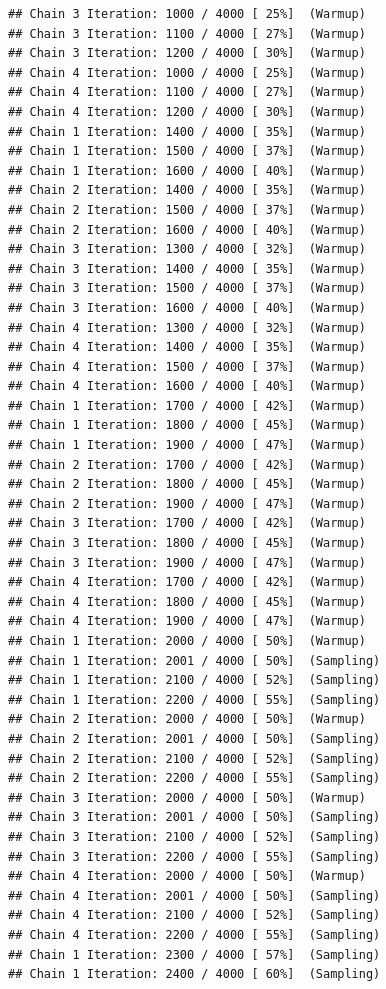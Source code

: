 \documentclass[
]{article}
\begin{document}
\begin{verbatim}
## Chain 3 Iteration: 1000 / 4000 [ 25%]  (Warmup) 
## Chain 3 Iteration: 1100 / 4000 [ 27%]  (Warmup) 
## Chain 3 Iteration: 1200 / 4000 [ 30%]  (Warmup) 
## Chain 4 Iteration: 1000 / 4000 [ 25%]  (Warmup) 
## Chain 4 Iteration: 1100 / 4000 [ 27%]  (Warmup) 
## Chain 4 Iteration: 1200 / 4000 [ 30%]  (Warmup) 
## Chain 1 Iteration: 1400 / 4000 [ 35%]  (Warmup) 
## Chain 1 Iteration: 1500 / 4000 [ 37%]  (Warmup) 
## Chain 1 Iteration: 1600 / 4000 [ 40%]  (Warmup) 
## Chain 2 Iteration: 1400 / 4000 [ 35%]  (Warmup) 
## Chain 2 Iteration: 1500 / 4000 [ 37%]  (Warmup) 
## Chain 2 Iteration: 1600 / 4000 [ 40%]  (Warmup) 
## Chain 3 Iteration: 1300 / 4000 [ 32%]  (Warmup) 
## Chain 3 Iteration: 1400 / 4000 [ 35%]  (Warmup) 
## Chain 3 Iteration: 1500 / 4000 [ 37%]  (Warmup) 
## Chain 3 Iteration: 1600 / 4000 [ 40%]  (Warmup) 
## Chain 4 Iteration: 1300 / 4000 [ 32%]  (Warmup) 
## Chain 4 Iteration: 1400 / 4000 [ 35%]  (Warmup) 
## Chain 4 Iteration: 1500 / 4000 [ 37%]  (Warmup) 
## Chain 4 Iteration: 1600 / 4000 [ 40%]  (Warmup) 
## Chain 1 Iteration: 1700 / 4000 [ 42%]  (Warmup) 
## Chain 1 Iteration: 1800 / 4000 [ 45%]  (Warmup) 
## Chain 1 Iteration: 1900 / 4000 [ 47%]  (Warmup) 
## Chain 2 Iteration: 1700 / 4000 [ 42%]  (Warmup) 
## Chain 2 Iteration: 1800 / 4000 [ 45%]  (Warmup) 
## Chain 2 Iteration: 1900 / 4000 [ 47%]  (Warmup) 
## Chain 3 Iteration: 1700 / 4000 [ 42%]  (Warmup) 
## Chain 3 Iteration: 1800 / 4000 [ 45%]  (Warmup) 
## Chain 3 Iteration: 1900 / 4000 [ 47%]  (Warmup) 
## Chain 4 Iteration: 1700 / 4000 [ 42%]  (Warmup) 
## Chain 4 Iteration: 1800 / 4000 [ 45%]  (Warmup) 
## Chain 4 Iteration: 1900 / 4000 [ 47%]  (Warmup) 
## Chain 1 Iteration: 2000 / 4000 [ 50%]  (Warmup) 
## Chain 1 Iteration: 2001 / 4000 [ 50%]  (Sampling) 
## Chain 1 Iteration: 2100 / 4000 [ 52%]  (Sampling) 
## Chain 1 Iteration: 2200 / 4000 [ 55%]  (Sampling) 
## Chain 2 Iteration: 2000 / 4000 [ 50%]  (Warmup) 
## Chain 2 Iteration: 2001 / 4000 [ 50%]  (Sampling) 
## Chain 2 Iteration: 2100 / 4000 [ 52%]  (Sampling) 
## Chain 2 Iteration: 2200 / 4000 [ 55%]  (Sampling) 
## Chain 3 Iteration: 2000 / 4000 [ 50%]  (Warmup) 
## Chain 3 Iteration: 2001 / 4000 [ 50%]  (Sampling) 
## Chain 3 Iteration: 2100 / 4000 [ 52%]  (Sampling) 
## Chain 3 Iteration: 2200 / 4000 [ 55%]  (Sampling) 
## Chain 4 Iteration: 2000 / 4000 [ 50%]  (Warmup) 
## Chain 4 Iteration: 2001 / 4000 [ 50%]  (Sampling) 
## Chain 4 Iteration: 2100 / 4000 [ 52%]  (Sampling) 
## Chain 4 Iteration: 2200 / 4000 [ 55%]  (Sampling) 
## Chain 1 Iteration: 2300 / 4000 [ 57%]  (Sampling) 
## Chain 1 Iteration: 2400 / 4000 [ 60%]  (Sampling) 

\end{verbatim}
\end{document}

